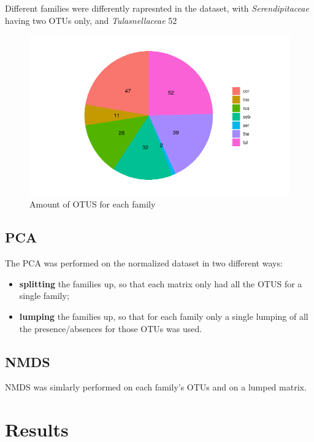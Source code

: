 Different families were differently rapresnted in the dataset, with \emph{Serendipitaceae} having two OTUs only, and \emph{Tulasnellaceae} 52

\begin{figure}[htbp]
\centering
\includegraphics[keepaspectratio,width=\textwidth,height=0.75\textheight]{images/freqFamilies.png}
\caption[title]{Amount of OTUS for each family}
\end{figure}

\section{PCA}
\label{pca}

The PCA was performed on the normalized dataset in two different ways:

\begin{itemize}
\item \textbf{splitting} the families up, so that each matrix only had all the OTUS for a single family;

\item \textbf{lumping} the families up, so that for each family only a single lumping of all the presence\slash absences for those OTUs was used.

\end{itemize}

\section{NMDS}
\label{nmds}

NMDS was simlarly performed on each family's OTUs and on a lumped matrix.

\chapter{Results}
\label{results}

